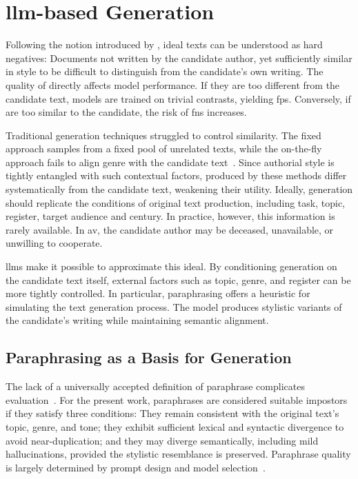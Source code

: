 \section{\acs{llm}-based \Imp{} Generation}
\label{sec:impostor_generation}

Following the notion introduced by \citet{koppel_determining_2014}, ideal \imp{} texts can be understood as hard negatives: 
Documents not written by the candidate author, yet sufficiently similar in style to be difficult to distinguish from the candidate's own writing. 
The quality of \imps{} directly affects model performance.
If they are too different from the candidate text, models are trained on trivial contrasts, yielding \acp{fp}. 
Conversely, if \imps{} are too similar to the candidate, the risk of \acp{fn} increases.

Traditional \imp{} generation techniques struggled to control \imp{} similarity. 
The fixed approach samples from a fixed pool of unrelated texts, while the on-the-fly approach fails to align genre with the candidate text~\citep{koppel_determining_2014}. 
Since authorial style is tightly entangled with such contextual factors, \imps{} produced by these methods differ systematically from the candidate text, weakening their utility. 
Ideally, \imp{} generation should replicate the conditions of original text production, including task, topic, register, target audience and century. 
In practice, however, this information is rarely available.
In \ac{av}, the candidate author may be deceased, unavailable, or unwilling to cooperate.

\acp{llm} make it possible to approximate this ideal. 
By conditioning generation on the candidate text itself, external factors such as topic, genre, and register can be more tightly controlled. 
In particular, paraphrasing offers a heuristic for simulating the text generation process. 
The model produces stylistic variants of the candidate's writing while maintaining semantic alignment.


\subsection{Paraphrasing as a Basis for \Imp{} Generation}

The lack of a universally accepted definition of paraphrase complicates evaluation~\citep{gohsen_task_oriented_2024}. 
For the present work, paraphrases are considered suitable impostors if they satisfy three conditions: 
They remain consistent with the original text's topic, genre, and tone; 
they exhibit sufficient lexical and syntactic divergence to avoid near-duplication; 
and they may diverge semantically, including mild hallucinations, provided the stylistic resemblance is preserved.
Paraphrase quality is largely determined by prompt design and model selection~\citep{Wu_ODD_challenges_2025}.

